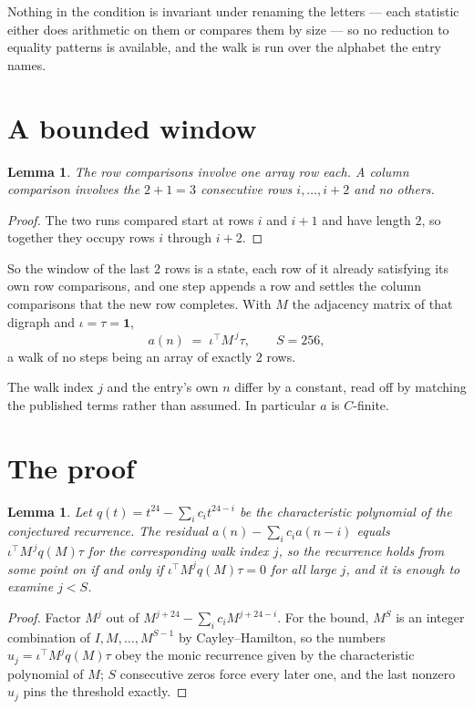 \documentclass[11pt,a4paper]{article}
\theoremstyle{plain}
\newtheorem{lemma}[theorem]{Lemma}
\theoremstyle{definition}
\begin{document}
Nothing in the condition is invariant under renaming the letters --- each statistic either does
arithmetic on them or compares them by size --- so no reduction to equality patterns is
available, and the walk is run over the alphabet the entry names.

\section{A bounded window}

\begin{lemma}\label{lem:win}
The row comparisons involve one array row each. A column comparison involves the
$2+1=3$ consecutive rows $i,\dots,i{+}2$ and no others.
\end{lemma}

\begin{proof}
The two runs compared start at rows $i$ and $i+1$ and have length $2$, so together they
occupy rows $i$ through $i+2$.
\end{proof}

So the window of the last $2$ rows is a state, each row of it already satisfying its own row
comparisons, and one step appends a row and settles the column comparisons that the new row
completes. With $M$ the adjacency matrix of that digraph and $\iota=\tau=\mathbf{1}$,
\[
a(n)\;=\;\iota^{\!\top}M^{\,j}\tau ,\qquad S=256,
\]
a walk of no steps being an array of exactly $2$ rows.

The walk index $j$ and the entry's own $n$ differ by a constant, read off by matching the
published terms rather than assumed. In particular $a$ is $C$-finite.

\section{The proof}

\begin{lemma}\label{lem:crit}
Let $q(t)=t^{24}-\sum_i c_it^{24-i}$ be the characteristic polynomial of the
conjectured recurrence. The residual $a(n)-\sum_ic_ia(n-i)$ equals
$\iota^{\!\top}M^{\,j}q(M)\tau$ for the corresponding walk index $j$, so the recurrence
holds from some point on if and only if $\iota^{\!\top}M^{j}q(M)\tau=0$ for all large $j$,
and it is enough to examine $j<S$.
\end{lemma}

\begin{proof}
Factor $M^{j}$ out of $M^{j+24}-\sum_ic_iM^{j+24-i}$. For the bound, $M^{S}$
is an integer combination of $I,M,\dots,M^{S-1}$ by Cayley--Hamilton, so the numbers
$u_j=\iota^{\!\top}M^{j}q(M)\tau$ obey the monic recurrence given by the characteristic
polynomial of $M$; $S$ consecutive zeros force every later one, and the last nonzero $u_j$
pins the threshold exactly.
\end{proof}
\end{document}
